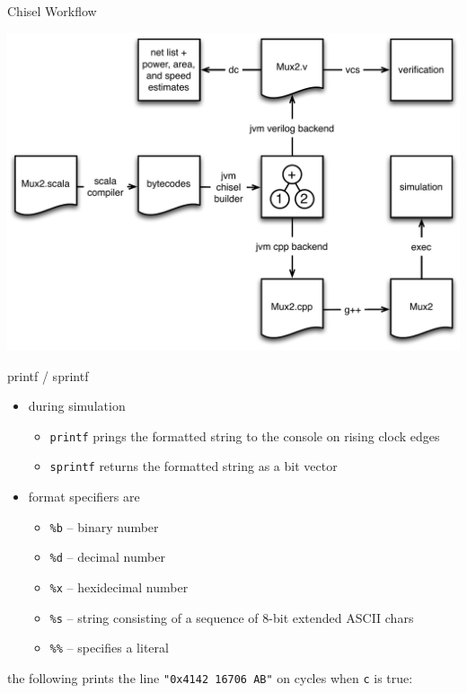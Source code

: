 \documentclass[xcolor=pdflatex,dvipsnames,table]{beamer}
\begin{document}
\begin{frame}{Chisel Workflow}
\begin{center}
\includegraphics[height=0.9\textheight]{../bootcamp/figs/chisel-workflow.pdf}
\end{center}
\end{frame}

\begin{frame}[fragile]{printf / sprintf}
\begin{itemize}
\item during simulation
\begin{itemize}
\item \verb+printf+ prings the formatted string to the console on rising clock edges
\item \verb+sprintf+ returns the formatted string as a bit vector
\end{itemize}
\item format specifiers are
\begin{itemize}
\item \verb+%b+ -- binary number
\item \verb+%d+ -- decimal number
\item \verb+%x+ -- hexidecimal number
\item \verb+%s+ -- string consisting of a sequence of 8-bit extended ASCII chars
\item \verb+%%+ -- specifies a literal %
\end{itemize}
\end{itemize}
the following prints the line \verb+"0x4142 16706 AB"+ on cycles when \verb+c+ is true:
\end{frame}
\end{document}
